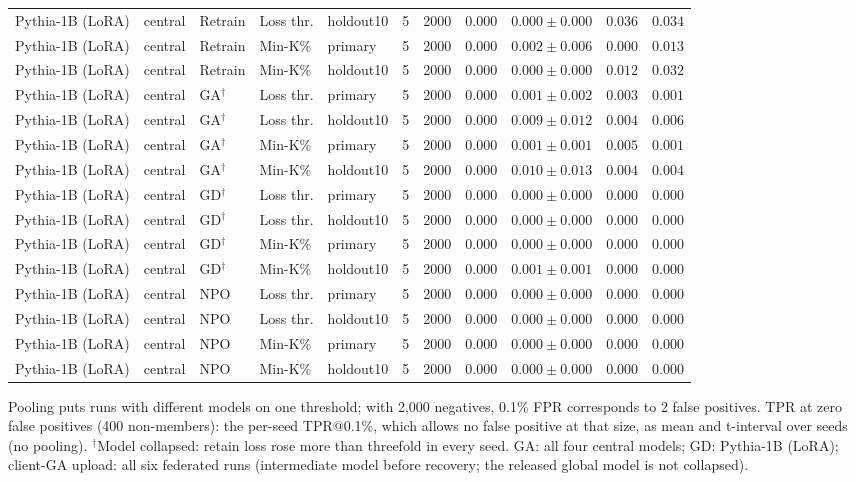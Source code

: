 {\begin{longtable}{@{\extracolsep{\fill}}lllllcccccc@{}}
Pythia-1B (LoRA) & central & Retrain & Loss thr. & holdout10 & 5 & 2000 & $0.000$ & $0.000 \pm 0.000$ & $0.036$ & $0.034$ \\
Pythia-1B (LoRA) & central & Retrain & Min-K\% & primary & 5 & 2000 & $0.000$ & $0.002 \pm 0.006$ & $0.000$ & $0.013$ \\
Pythia-1B (LoRA) & central & Retrain & Min-K\% & holdout10 & 5 & 2000 & $0.000$ & $0.000 \pm 0.000$ & $0.012$ & $0.032$ \\
Pythia-1B (LoRA) & central & GA$^{\dagger}$ & Loss thr. & primary & 5 & 2000 & $0.000$ & $0.001 \pm 0.002$ & $0.003$ & $0.001$ \\
Pythia-1B (LoRA) & central & GA$^{\dagger}$ & Loss thr. & holdout10 & 5 & 2000 & $0.000$ & $0.009 \pm 0.012$ & $0.004$ & $0.006$ \\
Pythia-1B (LoRA) & central & GA$^{\dagger}$ & Min-K\% & primary & 5 & 2000 & $0.000$ & $0.001 \pm 0.001$ & $0.005$ & $0.001$ \\
Pythia-1B (LoRA) & central & GA$^{\dagger}$ & Min-K\% & holdout10 & 5 & 2000 & $0.000$ & $0.010 \pm 0.013$ & $0.004$ & $0.004$ \\
Pythia-1B (LoRA) & central & GD$^{\dagger}$ & Loss thr. & primary & 5 & 2000 & $0.000$ & $0.000 \pm 0.000$ & $0.000$ & $0.000$ \\
Pythia-1B (LoRA) & central & GD$^{\dagger}$ & Loss thr. & holdout10 & 5 & 2000 & $0.000$ & $0.000 \pm 0.000$ & $0.000$ & $0.000$ \\
Pythia-1B (LoRA) & central & GD$^{\dagger}$ & Min-K\% & primary & 5 & 2000 & $0.000$ & $0.000 \pm 0.000$ & $0.000$ & $0.000$ \\
Pythia-1B (LoRA) & central & GD$^{\dagger}$ & Min-K\% & holdout10 & 5 & 2000 & $0.000$ & $0.001 \pm 0.001$ & $0.000$ & $0.000$ \\
Pythia-1B (LoRA) & central & NPO & Loss thr. & primary & 5 & 2000 & $0.000$ & $0.000 \pm 0.000$ & $0.000$ & $0.000$ \\
Pythia-1B (LoRA) & central & NPO & Loss thr. & holdout10 & 5 & 2000 & $0.000$ & $0.000 \pm 0.000$ & $0.000$ & $0.000$ \\
Pythia-1B (LoRA) & central & NPO & Min-K\% & primary & 5 & 2000 & $0.000$ & $0.000 \pm 0.000$ & $0.000$ & $0.000$ \\
Pythia-1B (LoRA) & central & NPO & Min-K\% & holdout10 & 5 & 2000 & $0.000$ & $0.000 \pm 0.000$ & $0.000$ & $0.000$ \\
\end{longtable}
Pooling puts runs with different models on one threshold; with 2,000 negatives, 0.1\% FPR corresponds to 2 false positives. TPR at zero false positives (400 non-members): the per-seed TPR@0.1\%, which allows no false positive at that size, as mean and t-interval over seeds (no pooling). $^{\dagger}$Model collapsed: retain loss rose more than threefold in every seed. GA: all four central models; GD: Pythia-1B (LoRA); client-GA upload: all six federated runs (intermediate model before recovery; the released global model is not collapsed).\par
}
